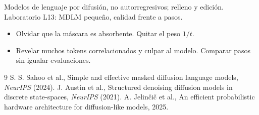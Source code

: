 \documentclass[11pt,a4paper]{article}
\begin{document}
\begin{aplicacion}
Modelos de lenguaje por difusión, no autorregresivos; relleno y edición. Laboratorio L13: MDLM pequeño, calidad frente a pasos.
\end{aplicacion}

\begin{error}
\begin{itemize}[nosep]
\item Olvidar que la máscara es absorbente. \quad Quitar el peso $1/t$.
\item Revelar muchos tokens correlacionados y culpar al modelo. \quad Comparar pasos sin igualar evaluaciones.
\end{itemize}
\end{error}

\begin{thebibliography}{9}\small
{} S. S. Sahoo et al., Simple and effective masked diffusion language models, \emph{NeurIPS} (2024).
 J. Austin et al., Structured denoising diffusion models in discrete state-spaces, \emph{NeurIPS} (2021).
 A. Jelinčič et al., An efficient probabilistic hardware architecture for diffusion-like models, 2025.
\end{thebibliography}
\end{document}
